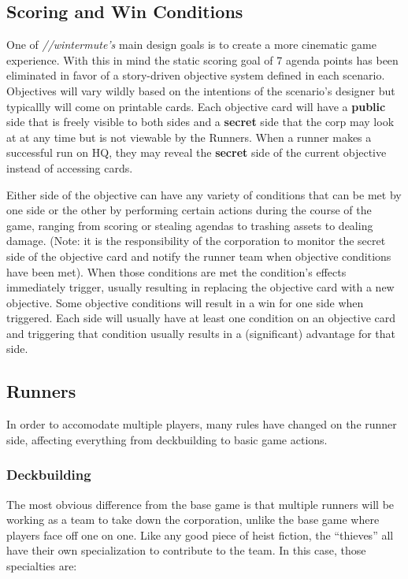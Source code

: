 \documentclass[titlepage]{article}
\begin{document}
	\subsection{Scoring and Win Conditions}

		One of \emph{//wintermute's} main design goals is to create a more cinematic game experience. With this in mind the static scoring goal of 7 agenda points has been eliminated in favor of a story-driven objective system defined in each scenario. Objectives will vary wildly based on the intentions of the scenario's designer but typicallly will come on printable cards. Each objective card will have a \textbf{public} side that is freely visible to both sides and a \textbf{secret} side that the corp may look at at any time but is not viewable by the Runners. When a runner makes a successful run on HQ, they may reveal the \textbf{secret} side of the current objective instead of accessing cards.

		Either side of the objective can have any variety of conditions that can be met by one side or the other by performing certain actions during the course of the game, ranging from scoring or stealing agendas to trashing assets to dealing damage. (Note: it is the responsibility of the corporation to monitor the secret side of the objective card and notify the runner team when objective conditions have been met). When those conditions are met the condition's effects immediately trigger, usually resulting in replacing the objective card with a new objective. Some objective conditions will result in a win for one side when triggered. Each side will usually have at least one condition on an objective card and triggering that condition usually results in a (significant) advantage for that side.

	\subsection{Runners}

		In order to accomodate multiple players, many rules have changed on the runner side, affecting everything from deckbuilding to basic game actions.

		\subsubsection{Deckbuilding}

			The most obvious difference from the base game is that multiple runners will be working as a team to take down the corporation, unlike the base game where players face off one on one. Like any good piece of heist fiction, the ``thieves'' all have their own specialization to contribute to the team. In this case, those specialties are:
\end{document}

